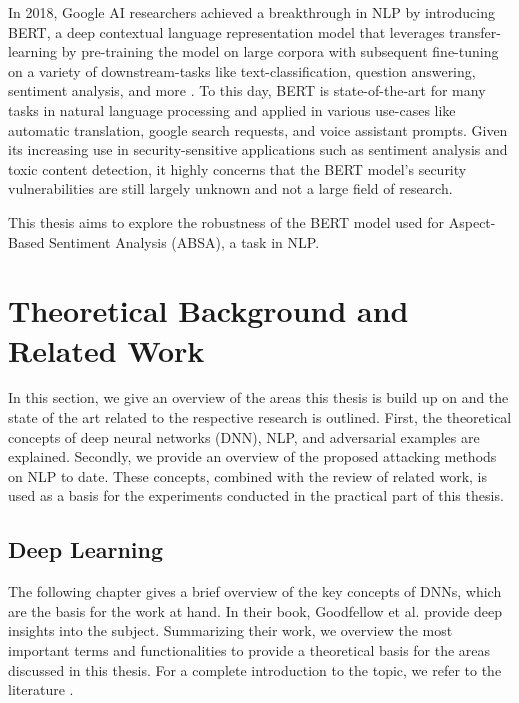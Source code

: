 In 2018, Google AI researchers achieved a breakthrough in NLP by introducing BERT, a deep contextual language representation model that leverages transfer-learning by pre-training the model on large corpora with subsequent fine-tuning on a variety of downstream-tasks like text-classification, question answering, sentiment analysis, and more \cite{devlin2018bert}. To this day, BERT is state-of-the-art for many tasks in natural language processing and applied in various use-cases like automatic translation, google search requests, and voice assistant prompts. 
Given its increasing use in security-sensitive applications such as sentiment analysis and toxic content detection, it highly concerns that the BERT model's security vulnerabilities are still largely unknown and not a large field of research.

This thesis aims to explore the robustness of the BERT model used for Aspect-Based Sentiment Analysis (ABSA), a task in NLP. 



\section{Theoretical Background and Related Work}

In this section, we give an overview of the areas this thesis is build up on and the state of the art related to the respective research is outlined. First, the theoretical concepts of deep neural networks (DNN), NLP, and adversarial examples are explained. Secondly, we provide an overview of the proposed attacking methods on NLP to date. These concepts, combined with the review of related work, is used as a basis for the experiments conducted in the practical part of this thesis. 

\subsection{Deep Learning}
The following chapter gives a brief overview of the key concepts of DNNs, which are the basis for the work at hand. In their book, Goodfellow et al. provide deep insights into the subject. Summarizing their work, we overview the most important terms and functionalities to provide a theoretical basis for the areas discussed in this thesis. For a complete introduction to the topic, we refer to the literature \cite{bengio2017deep}. 

